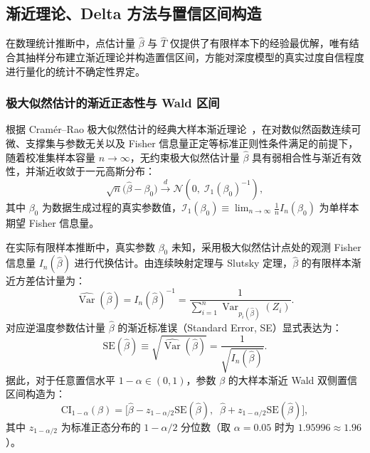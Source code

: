 
\subsection{渐近理论、Delta 方法与置信区间构造}

在数理统计推断中，点估计量 $\hat\beta$ 与 $\hat T$ 仅提供了有限样本下的经验最优解，唯有结合其抽样分布建立渐近理论并构造置信区间，方能对深度模型的真实过度自信程度进行量化的统计不确定性界定。

\subsubsection{极大似然估计的渐近正态性与 Wald 区间}

根据 Cramér--Rao 极大似然估计的经典大样本渐近理论~\cite{lehmann1998theory,vandervaart1998asymptotic}，在对数似然函数连续可微、支撑集与参数无关以及 Fisher 信息量正定等标准正则性条件满足的前提下，随着校准集样本容量 $n \to \infty$，无约束极大似然估计量 $\hat\beta$ 具有弱相合性与渐近有效性，并渐近收敛于一元高斯分布：
\begin{equation}\label{eq:asymptotic_beta}
\sqrt{n}\big(\hat\beta - \beta_0\big) \xrightarrow{d} \mathcal{N}\left(0, \;\mathcal{I}_1(\beta_0)^{-1}\right),
\end{equation}
其中 $\beta_0$ 为数据生成过程的真实参数值，$\mathcal{I}_1(\beta_0) \equiv \lim_{n \to \infty} \frac{1}{n} I_n(\beta_0)$ 为单样本期望 Fisher 信息量。

在实际有限样本推断中，真实参数 $\beta_0$ 未知，采用极大似然估计点处的观测 Fisher 信息量 $I_n(\hat\beta)$ 进行代换估计。由连续映射定理与 Slutsky 定理，$\hat\beta$ 的有限样本渐近方差估计量为：
\begin{equation}\label{eq:var_beta_est}
\widehat{\operatorname{Var}}(\hat\beta) = I_n(\hat\beta)^{-1} = \frac{1}{\sum_{i=1}^n \operatorname{Var}_{p_i(\hat\beta)}(Z_i)}.
\end{equation}
对应逆温度参数估计量 $\hat\beta$ 的渐近标准误（Standard Error, SE）显式表达为：
\begin{equation}\label{eq:se_beta}
\mathrm{SE}(\hat\beta) \equiv \sqrt{\widehat{\operatorname{Var}}(\hat\beta)} = \frac{1}{\sqrt{I_n(\hat\beta)}}.
\end{equation}
据此，对于任意置信水平 $1-\alpha \in (0, 1)$，参数 $\beta$ 的大样本渐近 Wald 双侧置信区间构造为：
\begin{equation}\label{eq:wald_ci_beta}
\mathrm{CI}_{1-\alpha}(\beta) = \big[ \hat\beta - z_{1-\alpha/2}\mathrm{SE}(\hat\beta), \;\; \hat\beta + z_{1-\alpha/2}\mathrm{SE}(\hat\beta) \big],
\end{equation}
其中 $z_{1-\alpha/2}$ 为标准正态分布的 $1-\alpha/2$ 分位数（取 $\alpha=0.05$ 时为 $1.95996 \approx 1.96$）。

